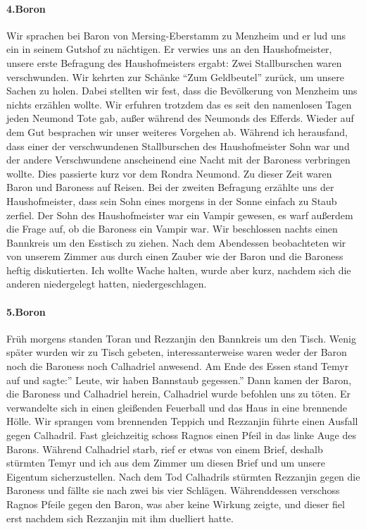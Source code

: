 \paragraph{4.Boron}
Wir sprachen bei Baron von Mersing-Eberstamm zu Menzheim und er lud uns ein in seinem Gutshof zu nächtigen. Er verwies uns an den Haushofmeister, unsere erste Befragung des Haushofmeisters ergabt: Zwei Stallburschen waren verschwunden. Wir kehrten zur Schänke ``Zum Geldbeutel'' zurück, um unsere Sachen zu holen. Dabei stellten wir fest, dass die Bevölkerung von Menzheim uns nichts erzählen wollte. Wir erfuhren trotzdem das es seit den namenlosen Tagen jeden Neumond Tote gab, außer während des Neumonds des Efferds. Wieder auf dem Gut besprachen wir unser weiteres Vorgehen ab.
Während ich herausfand, dass einer der verschwundenen Stallburschen des Haushofmeister Sohn war und der andere Verschwundene anscheinend eine Nacht mit der Baroness verbringen wollte. Dies passierte kurz vor dem Rondra Neumond. Zu dieser Zeit waren Baron und Baroness auf Reisen. Bei der zweiten Befragung erzählte uns der Haushofmeister, dass sein Sohn eines morgens in der Sonne einfach zu Staub zerfiel. Der Sohn des Haushofmeister war ein Vampir gewesen, es warf außerdem die Frage auf, ob die Baroness ein Vampir war. Wir beschlossen nachts einen Bannkreis um den Esstisch zu ziehen. Nach dem Abendessen beobachteten wir von unserem Zimmer aus durch einen Zauber wie der Baron und die Baroness heftig diskutierten. Ich wollte Wache halten, wurde aber kurz, nachdem sich die anderen niedergelegt hatten, niedergeschlagen.

\paragraph{5.Boron}
Früh morgens standen Toran und Rezzanjin den Bannkreis um den Tisch. Wenig später wurden wir zu Tisch gebeten, interessanterweise waren weder der Baron noch die Baroness noch Calhadriel anwesend. Am Ende des Essen stand Temyr auf und sagte:'' Leute, wir haben Bannstaub gegessen.'' Dann kamen der Baron, die Baroness und Calhadriel herein, Calhadriel wurde befohlen uns zu töten. Er verwandelte sich in einen gleißenden Feuerball und das Haus in eine brennende Hölle.
Wir sprangen vom brennenden Teppich und Rezzanjin führte einen Ausfall gegen Calhadril. Fast gleichzeitig schoss Ragnos einen Pfeil in das linke Auge des Barons. Während Calhadriel starb, rief er etwas von einem Brief, deshalb stürmten Temyr und ich aus dem Zimmer um diesen Brief und um unsere Eigentum sicherzustellen. Nach dem Tod Calhadrils stürmten Rezzanjin gegen die Baroness und fällte sie nach zwei bis vier Schlägen. Währenddessen verschoss Ragnos Pfeile gegen den Baron, was aber keine Wirkung zeigte, und dieser fiel erst nachdem sich Rezzanjin mit ihm duelliert hatte.

